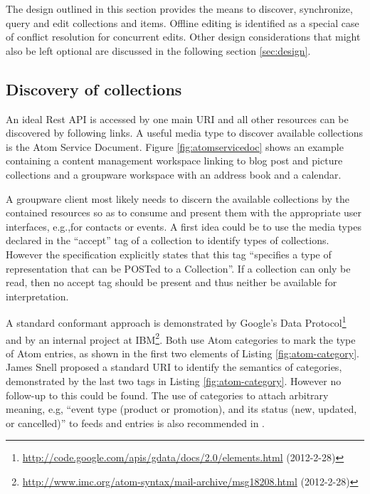 \documentclass[11pt,a4paper,headsepline,twoside]{scrartcl}		%
\newcommand{\citeurl}[2]{\url{#1} (#2)}
\begin{document}
The design outlined in this section provides the means to discover, synchronize,
query and edit collections and items. Offline editing is identified as a special
case of conflict resolution for concurrent edits. Other design considerations
that might also be left optional are discussed in the following section
\ref{sec:design}.

\subsection{Discovery of collections}
\label{sec:disc-coll}

An ideal Rest API is accessed by one main URI and all other resources can be
discovered by following links. A useful media type to discover available
collections is the Atom Service Document\cite[sec. 8]{RFC5023}. Figure
\ref{fig:atomservicedoc} shows an example containing a content management
workspace linking to blog post and picture collections and a groupware workspace
with an address book and a calendar.

A groupware client most likely needs to discern the available collections by the
contained resources so as to consume and present them with the appropriate user
interfaces, e.g.,for contacts or events. A first idea could be to use the
media types declared in the ``accept'' tag of a collection to identify types of
collections. However the specification explicitly states that this tag
``specifies a type of representation that can be POSTed to a
Collection''\cite[sec. 8.3.4]{RFC5023}. If a collection can only be read, then
no accept tag should be present and thus neither be available for
interpretation.

A standard conformant approach is demonstrated by Google's Data
Protocol\footnote{\citeurl{http://code.google.com/apis/gdata/docs/2.0/elements.html}{2012-2-28}}
and by an internal project at
IBM\footnote{\label{snellatomcategory}\citeurl{http://www.imc.org/atom-syntax/mail-archive/msg18208.html}{2012-2-28}}. Both
use Atom categories\cite[sec. 8.3.6]{RFC5023} to mark the type of Atom entries,
as shown in the first two elements of Listing \ref{fig:atom-category}. James
Snell proposed a standard URI to identify the semantics of
categories, demonstrated by the last two tags in
Listing \ref{fig:atom-category}. However no follow-up to this could be
found. The use of categories to attach arbitrary meaning, e.g, ``event type
(product or promotion), and its status (new, updated, or cancelled)'' to feeds
and entries is also recommended in \cite[p. 200]{Webber2010}.
\end{document}

